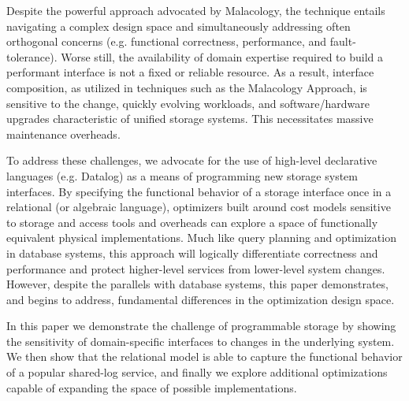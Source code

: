 Despite the powerful approach advocated by Malacology, the technique entails navigating 
a complex design space and simultaneously addressing often orthogonal
concerns (e.g. functional correctness, performance, and fault-tolerance).
Worse still, the availability of domain expertise required to build a performant interface is not a fixed or reliable resource. 
As a result, interface composition, as utilized in techniques such as the Malacology Approach, is sensitive to
the change, quickly evolving workloads, and software/hardware upgrades characteristic of unified storage systems.
This necessitates massive maintenance overheads.

To address these challenges, we advocate for the use of high-level declarative
languages (e.g. Datalog) as a means of programming new storage system
interfaces.  By specifying the functional behavior of a storage interface once
in a relational (or algebraic language), optimizers built around cost models
sensitive to storage and access tools and overheads can explore a space of
functionally equivalent physical implementations. Much like query planning and
optimization in database systems, this approach will logically differentiate
correctness and performance and protect higher-level services from lower-level
system changes. However, despite the parallels with database systems, this
paper demonstrates, and begins to address, fundamental differences in the
optimization design space.

In this paper we demonstrate the challenge of programmable storage by showing
the sensitivity of domain-specific interfaces to changes in the underlying
system. We then show that the relational model is able to capture the
functional behavior of a popular shared-log service, and finally we explore
additional optimizations capable of expanding the space of
possible implementations.
